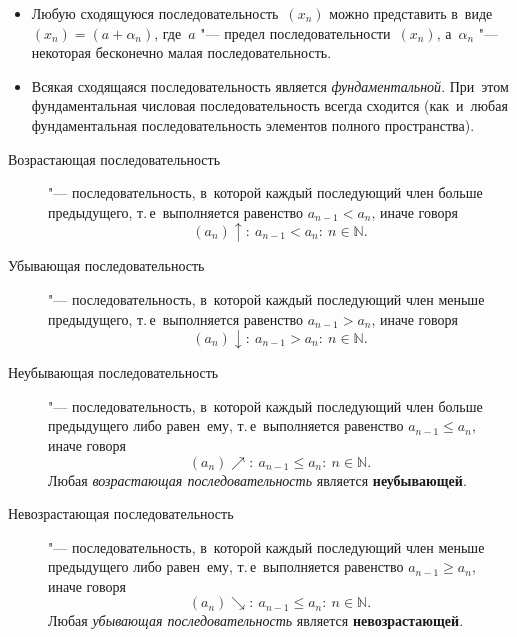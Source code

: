 \documentclass[]{scrartcl}
\begin{document}
\begin{itemize}
	\item Любую сходящуюся последовательность~${\textstyle (x_{n})}$ можно представить в~виде~ ${\textstyle (x_{n})=(a+\alpha _{n})}$, где~${\textstyle a}$ "--- предел последовательности~${\textstyle (x_{n})}$, а~${\textstyle \alpha _{n}}$ "--- некоторая бесконечно малая последовательность.
	\item Всякая сходящаяся последовательность является \emph{фундаментальной}. При~этом фундаментальная числовая последовательность всегда сходится (как~и~любая фундаментальная последовательность элементов полного пространства).
\end{itemize}

\begin{description}
	\item[Возрастающая последовательность] "--- последовательность, в~которой каждый последующий член больше предыдущего, т.\,е~выполняется равенство ${\textstyle a_{n-1}<a_n}$, иначе говоря
	\begin{equation}\label{eq:increasing-sequence}
	(a_n)\uparrow:\ a_{n-1}<a_n:\ n \in \mathbb{N}.
	\end{equation}
	\item[Убывающая последовательность] "--- последовательность, в~которой каждый последующий член меньше предыдущего, т.\,е~выполняется равенство ${\textstyle a_{n-1}>a_n}$, иначе говоря
	\begin{equation}\label{eq:decreasing-sequence}
	(a_n)\downarrow:\ a_{n-1}>a_n:\ n \in \mathbb{N}.
	\end{equation}
	\item[Неубывающая последовательность] "--- последовательность, в~которой каждый последующий член больше предыдущего либо равен~ему, т.\,е~выполняется равенство ${\textstyle a_{n-1}\leq a_n}$, иначе говоря
	\begin{equation}\label{eq:non-decreasing-sequence}
	(a_n)\nearrow:\ a_{n-1} \leq a_n:\ n \in \mathbb{N}.
	\end{equation}
	Любая \emph{возрастающая последовательность} является \textbf{неубывающей}.
	\item[Невозрастающая последовательность] "--- последовательность, в~которой каждый последующий член меньше предыдущего либо равен~ему, т.\,е~выполняется равенство ${\textstyle a_{n-1}\geq a_n}$, иначе говоря
	\begin{equation}\label{eq:non-increasing-sequence}
	(a_n)\searrow:\ a_{n-1} \leq a_n:\ n \in \mathbb{N}.
	\end{equation}
	Любая \emph{убывающая последовательность} является \textbf{невозрастающей}.  

\end{description}
\end{document}
